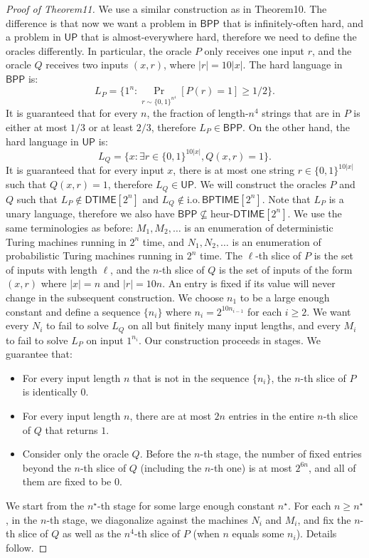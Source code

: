 \documentclass[10pt,a4paper]{article}
\begin{document}
\begin{proof}[Proof of Theorem11]
We use a similar construction as in Theorem10. The difference is that now we want a problem in $\mathsf{BPP}$ that is infinitely-often hard, and a problem in $\mathsf{UP}$ that is almost-everywhere hard, therefore we need to define the oracles differently. In particular, the oracle $P$ only receives one input $r$, and the oracle $Q$ receives two inputs $(x,r)$, where $|r|=10|x|$. The hard language in $\mathsf{BPP}$ is:
\[L_P=\{1^n:\Pr_{r\sim\{0,1\}^{n^4}}[P(r)=1]\geq1/2\}.\]
It is guaranteed that for every $n$, the fraction of length-$n^4$ strings that are in $P$ is either at most $1/3$ or at least $2/3$, therefore $L_P\in\mathsf{BPP}$. On the other hand, the hard language in $\mathsf{UP}$ is:
\[L_Q=\{x:\exists r\in\{0,1\}^{10|x|},Q(x,r)=1\}.\]
It is guaranteed that for every input $x$, there is at most one string $r\in\{0,1\}^{10|x|}$ such that $Q(x,r)=1$, therefore $L_Q\in\mathsf{UP}$. We will construct the oracles $P$ and $Q$ such that $L_P\notin\mathsf{DTIME}[2^n]$ and $L_Q\notin\mathrm{i.o.}\,\mathsf{BPTIME}[2^n]$. Note that $L_P$ is a unary language, therefore we also have $\mathsf{BPP}\not\subseteq\mathrm{heur}\text{-}\mathsf{DTIME}[2^n]$.
We use the same terminologies as before: $M_1,M_2,\ldots$ is an enumeration of deterministic Turing machines running in $2^n$ time, and $N_1,N_2,\ldots$ is an enumeration of probabilistic Turing machines running in $2^n$ time. The $\ell$-th slice of $P$ is the set of inputs with length $\ell$, and the $n$-th slice of $Q$ is the set of inputs of the form $(x,r)$ where $|x|=n$ and $|r|=10n$. An entry is fixed if its value will never change in the subsequent construction. We choose $n_1$ to be a large enough constant and define a sequence $\{n_i\}$ where $n_i=2^{10n_{i-1}}$ for each $i\geq2$. We want every $N_i$ to fail to solve $L_Q$ on all but finitely many input lengths, and every $M_i$ to fail to solve $L_P$ on input $1^{n_i}$.
Our construction proceeds in stages. We guarantee that:
\begin{itemize}
\item For every input length $n$ that is not in the sequence $\{n_i\}$, the $n$-th slice of $P$ is identically $0$.
\item For every input length $n$, there are at most $2n$ entries in the entire $n$-th slice of $Q$ that returns $1$.
\item Consider only the oracle $Q$. Before the $n$-th stage, the number of fixed entries beyond the $n$-th slice of $Q$ (including the $n$-th one) is at most $2^{6n}$, and all of them are fixed to be $0$.
\end{itemize}
We start from the $n^{\star}$-th stage for some large enough constant $n^{\star}$. For each $n\geq n^{\star}$, in the $n$-th stage, we diagonalize against the machines $N_i$ and $M_i$, and fix the $n$-th slice of $Q$ as well as the $n^4$-th slice of $P$ (when $n$ equals some $n_i$). Details follow.

\end{proof}
\end{document}
